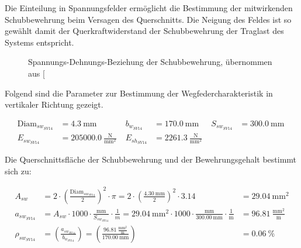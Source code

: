 \documentclass[
  10pt,
  letterpaper,
]{scrreprt}
\begin{document}
Die Einteilung in Spannungsfelder ermöglicht die Bestimmung der
mitwirkenden Schubbewehrung beim Versagen des Querschnitts. Die Neigung
des Feldes ist so gewählt damit der Querkraftwiderstand der
Schubbewehrung der Traglast des Systems entspricht.

\begin{figure}[H]


\caption{\label{fig-sigma-epsilon-sv14}Spannungs-Dehnungs-Beziehung der
Schubbewehrung, übernommen aus
{[}\citeproc{ref-gitz_ansatze_2024}{1}{]}}

\end{figure}%

Folgend sind die Parameter zur Bestimmung der Wegfedercharakteristik in
vertikaler Richtung gezeigt.

$$
\begin{aligned}
\mathrm{Diam}_{sw_{SV14}} &= 4.3\ \mathrm{mm} \; 
 &b_{w_{SV14}} &= 170.0\ \mathrm{mm} \; 
 &S_{sw_{SV14}} &= 300.0\ \mathrm{mm} \; 
\\[12pt]
 E_{sw_{SV14}} &= 205000.0\ \frac{\mathrm{N}}{\mathrm{mm}^{2}} \; 
 &E_{sh_{SV14}} &= 2261.3\ \frac{\mathrm{N}}{\mathrm{mm}^{2}} \;
\end{aligned}
$$

Die Querschnittsfläche der Schubbewehrung und der Bewehrungsgehalt
bestimmt sich zu:

$$
\begin{aligned}
A_{sw} &= 2 \cdot \left( \frac{ \mathrm{Diam}_{sw_{SV14}} }{ 2 } \right) ^{ 2 } \cdot \pi  = 2 \cdot \left( \frac{ 4.30\ \mathrm{mm} }{ 2 } \right) ^{ 2 } \cdot 3.14 &= 29.04\ \mathrm{mm}^{2}  
\\[12pt]
a_{sw_{SV14}} &= A_{sw} \cdot 1000 \cdot \frac{ \mathrm{mm} }{ S_{sw_{SV14}} } \cdot \frac{1} { m }  = 29.04\ \mathrm{mm}^{2} \cdot 1000 \cdot \frac{ \mathrm{mm} }{ 300.00\ \mathrm{mm} } \cdot \frac{1} { \mathrm{m} } &= 96.81\ \frac{\mathrm{mm}^{2}}{\mathrm{m}}  
\\[12pt]
\rho_{sw_{SV14}} &= \left( \frac{ a_{sw_{SV14}} }{ b_{w_{SV14}} } \right)  = \left( \frac{ 96.81\ \frac{\mathrm{mm}^{2}}{\mathrm{m}} }{ 170.00\ \mathrm{mm} } \right) &= 0.06\ \mathrm{\%}  
\end{aligned}
$$
\end{document}

